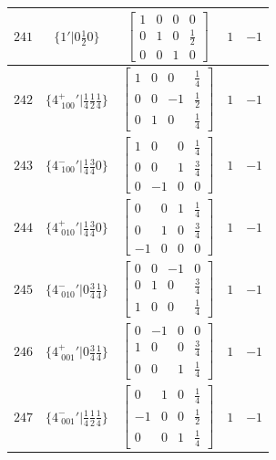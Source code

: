 \documentclass[fleqn,8pt]{jsarticle}
\begin{document}
\begin{longtable}{ccccc}
$ 241 $ & $ \{1{}'|0 \frac{1}{2} 0\} $ & $ \begin{bmatrix} 1 & 0 & 0 & 0 \\ 0 & 1 & 0 & \frac{1}{2} \\ 0 & 0 & 1 & 0 \end{bmatrix} $ & $ 1 $ & $ -1 $ \\ \hline
$ 242 $ & $ \{4^{+}_{\,\,100}{}'|\frac{1}{4} \frac{1}{2} \frac{1}{4}\} $ & $ \begin{bmatrix} 1 & 0 & 0 & \frac{1}{4} \\ 0 & 0 & -1 & \frac{1}{2} \\ 0 & 1 & 0 & \frac{1}{4} \end{bmatrix} $ & $ 1 $ & $ -1 $ \\ \hline
$ 243 $ & $ \{4^{-}_{\,\,100}{}'|\frac{1}{4} \frac{3}{4} 0\} $ & $ \begin{bmatrix} 1 & 0 & 0 & \frac{1}{4} \\ 0 & 0 & 1 & \frac{3}{4} \\ 0 & -1 & 0 & 0 \end{bmatrix} $ & $ 1 $ & $ -1 $ \\ \hline
$ 244 $ & $ \{4^{+}_{\,\,010}{}'|\frac{1}{4} \frac{3}{4} 0\} $ & $ \begin{bmatrix} 0 & 0 & 1 & \frac{1}{4} \\ 0 & 1 & 0 & \frac{3}{4} \\ -1 & 0 & 0 & 0 \end{bmatrix} $ & $ 1 $ & $ -1 $ \\ \hline
$ 245 $ & $ \{4^{-}_{\,\,010}{}'|0 \frac{3}{4} \frac{1}{4}\} $ & $ \begin{bmatrix} 0 & 0 & -1 & 0 \\ 0 & 1 & 0 & \frac{3}{4} \\ 1 & 0 & 0 & \frac{1}{4} \end{bmatrix} $ & $ 1 $ & $ -1 $ \\ \hline
$ 246 $ & $ \{4^{+}_{\,\,001}{}'|0 \frac{3}{4} \frac{1}{4}\} $ & $ \begin{bmatrix} 0 & -1 & 0 & 0 \\ 1 & 0 & 0 & \frac{3}{4} \\ 0 & 0 & 1 & \frac{1}{4} \end{bmatrix} $ & $ 1 $ & $ -1 $ \\ \hline
$ 247 $ & $ \{4^{-}_{\,\,001}{}'|\frac{1}{4} \frac{1}{2} \frac{1}{4}\} $ & $ \begin{bmatrix} 0 & 1 & 0 & \frac{1}{4} \\ -1 & 0 & 0 & \frac{1}{2} \\ 0 & 0 & 1 & \frac{1}{4} \end{bmatrix} $ & $ 1 $ & $ -1 $ \\ \hline

\end{longtable}
\end{document}
